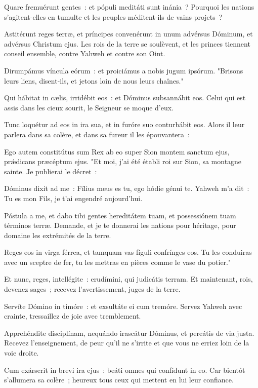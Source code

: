 \begin{paracol}{2}

\LigneParacol{0cm}
{Quare fremuérunt gentes~: \GreStar{} et pópuli meditáti sunt inánia~?}
{Pourquoi les nations s'agitent-elles en tumulte et les peuples méditent-ils de vains projets~? }

\LigneParacol{0.2cm}
{Astitérunt reges terræ, et príncipes convenérunt in unum \GreStar{} advérsus Dóminum, et advérsus Christum ejus.}
{Les rois de la terre se soulèvent, et les princes tiennent conseil ensemble, contre Yahweh et contre son Oint. }

\LigneParacol{0.2cm}
{Dirumpámus víncula eórum~: \GreStar{} et proiciámus a nobis jugum ipsórum.}
{"Brisons leurs liens, disent-ils, et jetons loin de nous leurs chaînes." }

\LigneParacol{0.2cm}
{Qui hábitat in cælis, irridébit eos~: \GreStar{} et Dóminus subsannábit eos.}
{Celui qui est assis dans les cieux sourit, le Seigneur se moque d'eux. }

\LigneParacol{0.2cm}
{Tunc loquétur ad eos in ira sua, \GreStar{} et in furóre suo conturbábit eos.}
{Alors il leur parlera dans sa colère, et dans sa fureur il les épouvantera~: }

\LigneParacol{0.2cm}
{Ego autem constitútus sum Rex ab eo super Sion montem sanctum ejus, \GreStar{} prǽdicans præcéptum ejus.}
{"Et moi, j'ai été établi roi sur Sion, sa montagne sainte. Je publierai le décret~:}

\LigneParacol{0.2cm}
{Dóminus dixit ad me~: \GreStar{} Fílius meus es tu, ego hódie génui te.}
{Yahweh m'a dit~: Tu es mon Fils, je t'ai engendré aujourd'hui. }

\LigneParacol{0.2cm}
{Póstula a me, et dabo tibi gentes hereditátem tuam, \GreStar{} et possessiónem tuam términos terræ.}
{Demande, et je te donnerai les nations pour héritage, pour domaine les extrémités de la terre. }

\LigneParacol{0.2cm}
{Reges eos in virga férrea, \GreStar{} et tamquam vas fíguli confrínges eos.}
{Tu les conduiras avec un sceptre de fer, tu les mettras en pièces comme le vase du potier." }

\LigneParacol{0.2cm}
{Et nunc, reges, intellégite~: \GreStar{} erudímini, qui judicátis terram.}
{Et maintenant, rois, devenez sages~; recevez l'avertissement, juges de la terre. }

\LigneParacol{0.2cm}
{Servíte Dómino in timóre~: \GreStar{} et exsultáte ei cum tremóre.}
{Servez Yahweh avec crainte, tressaillez de joie avec tremblement. }

\LigneParacol{0.2cm}
{Apprehéndite disciplínam, nequándo irascátur Dóminus, \GreStar{} et pereátis de via justa.}
{Recevez l'enseignement, de peur qu'il ne s'irrite et que vous ne erriez loin de la voie droite.}

\LigneParacol{0.2cm}
{Cum exárserit in brevi ira ejus~: \GreStar{} beáti omnes qui confídunt in eo.}
{Car bientôt s'allumera sa colère~; heureux tous ceux qui mettent en lui leur confiance. }

\end{paracol}
